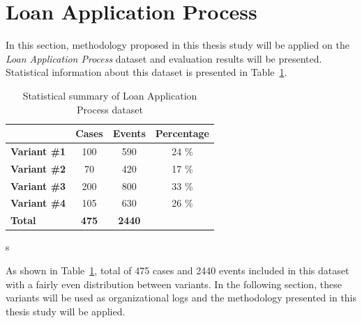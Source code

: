\section{Loan Application Process}
\label{sec:loan-app-process}
In this section, methodology proposed in this thesis study will be applied on the \textit{Loan Application Process} dataset \cite{loan-app-data} and evaluation results will be presented. Statistical information about this dataset is presented in Table~\ref{table:loan-app-process-summary}.
\begin{table}[]
\centering
\caption{Statistical summary of Loan Application Process dataset}
\label{table:loan-app-process-summary}
\begin{tabular}{@{}lccc@{}}
\toprule
                  & {\bf Cases} & {\bf Events} & {\bf Percentage} \\ \midrule
{\bf Variant \#1} & 100         & 590          & 24 \%            \\ \midrule
{\bf Variant \#2} & 70          & 420          & 17 \%            \\ \midrule
{\bf Variant \#3} & 200         & 800          & 33 \%            \\ \midrule
{\bf Variant \#4} & 105         & 630          & 26 \%            \\ \midrule
{\bf Total}       & {\bf 475}   & {\bf 2440}   & {\bf }           \\ \bottomrule
\end{tabular}
\end{table}s

As shown in Table~\ref{table:loan-app-process-summary}, total of 475 cases and 2440 events included in this dataset with a fairly even distribution between variants. In the following section, these variants will be used as organizational logs and the methodology presented in this thesis study will be applied.

